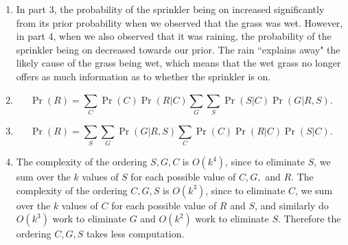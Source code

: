 \documentclass[submit]{harvardml}
\begin{document}
\begin{enumerate}
	\item In part 3, the probability of the sprinkler being on increased significantly from its prior probability when we observed that the grass was wet. However, in part 4, when we also observed that it was raining, the probability of the sprinkler being on decreased towards our prior.
	The rain ``explains away" the likely cause of the grass being wet, which means that the wet grass no longer offers as much information as to whether the sprinkler is on.

	\item
	$$
	\Pr(R) = \sum_C \Pr(C)\Pr(R|C) \sum_G \sum_S \Pr(S|C)\Pr(G | R, S).
	$$
	
	\item 
	$$
	\Pr(R) = \sum_S \sum_G \Pr(G | R, S) \sum_C \Pr(C)\Pr(R|C)\Pr(S|C).
	$$
	
	\item The complexity of the ordering $S, G, C$ is $O(k^4)$, since to eliminate $S$, we sum over the $k$ values of $S$ for each possible value of $C, G,$ and $R$.
	The complexity of the ordering $C, G, S$ is $O(k^3)$, since to eliminate $C$, we sum over the $k$ values of $C$ for each possible value of $R$ and $S$, and similarly do $O(k^3)$ work to eliminate $G$ and $O(k^2)$ work to eliminate $S$.
	Therefore the ordering $C, G, S$ takes less computation.
	
\end{enumerate}

\newpage
\end{document}
